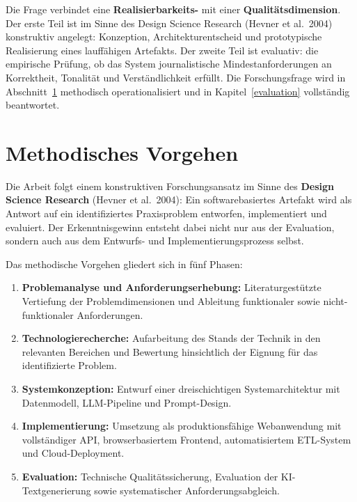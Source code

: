 Die Frage verbindet eine \textbf{Realisierbarkeits-} mit einer \textbf{Qualitätsdimension}. Der erste Teil ist im Sinne des Design Science Research (Hevner et al.~2004) konstruktiv angelegt: Konzeption, Architekturentscheid und prototypische Realisierung eines lauffähigen Artefakts. Der zweite Teil ist evaluativ: die empirische Prüfung, ob das System journalistische Mindestanforderungen an Korrektheit, Tonalität und Verständlichkeit erfüllt. Die Forschungsfrage wird in Abschnitt~\ref{methodisches-vorgehen} methodisch operationalisiert und in Kapitel~\ref{evaluation} vollständig beantwortet.



\section{Methodisches Vorgehen}\label{methodisches-vorgehen}

Die Arbeit folgt einem konstruktiven Forschungsansatz im Sinne des
\textbf{Design Science Research} (Hevner et al.~2004): Ein
softwarebasiertes Artefakt wird als Antwort auf ein identifiziertes
Praxisproblem entworfen, implementiert und evaluiert. Der
Erkenntnisgewinn entsteht dabei nicht nur aus der Evaluation, sondern
auch aus dem Entwurfs- und Implementierungsprozess selbst.

Das methodische Vorgehen gliedert sich in fünf Phasen:

\begin{enumerate}
\def\labelenumi{\arabic{enumi}.}
\tightlist
\item
  \textbf{Problemanalyse und Anforderungserhebung:} Literaturgestützte
  Vertiefung der Problemdimensionen und Ableitung funktionaler sowie
  nicht-funktionaler Anforderungen.
\item
  \textbf{Technologierecherche:} Aufarbeitung des Stands der Technik in
  den relevanten Bereichen und Bewertung hinsichtlich der Eignung für
  das identifizierte Problem.
\item
  \textbf{Systemkonzeption:} Entwurf einer dreischichtigen
  Systemarchitektur mit Datenmodell, LLM-Pipeline und Prompt-Design.
\item
  \textbf{Implementierung:} Umsetzung als produktionsfähige Webanwendung
  mit vollständiger API, browserbasiertem Frontend, automatisiertem
  ETL-System und Cloud-Deployment.
\item
  \textbf{Evaluation:} Technische Qualitätssicherung, Evaluation der
  KI-Textgenerierung sowie systematischer Anforderungsabgleich.
\end{enumerate}

